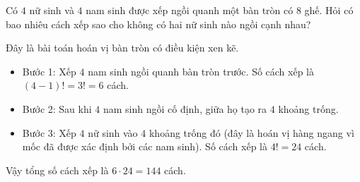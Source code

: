 \begin{ex}%
	Có $4$ nữ sinh và $4$ nam sinh được xếp ngồi quanh một bàn tròn có $8$ ghế. Hỏi có bao nhiêu cách xếp sao cho không có hai nữ sinh nào ngồi cạnh nhau?
	\loigiai
	{
		Đây là bài toán hoán vị bàn tròn có điều kiện xen kẽ.
		\begin{itemize}
			\item Bước 1: Xếp $4$ nam sinh ngồi quanh bàn tròn trước. Số cách xếp là $(4-1)! = 3! = 6$ cách.
			\item Bước 2: Sau khi $4$ nam sinh ngồi cố định, giữa họ tạo ra $4$ khoảng trống.
			\item Bước 3: Xếp $4$ nữ sinh vào $4$ khoảng trống đó (đây là hoán vị hàng ngang vì mốc đã được xác định bởi các nam sinh). Số cách xếp là $4! = 24$ cách.
		\end{itemize}
		Vậy tổng số cách xếp là $6 \cdot  24 = 144$ cách.
	}
\end{ex}
